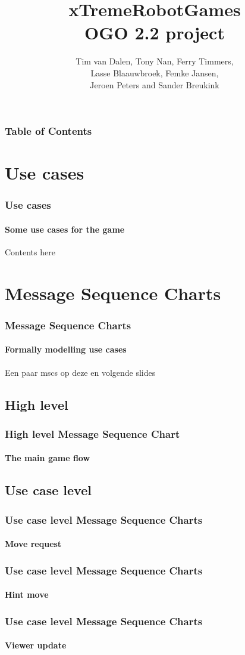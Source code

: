 \documentclass{beamer}
\title{xTremeRobotGames\\\small OGO 2.2 project}
\author{Tim van Dalen, Tony Nan, Ferry Timmers,\\ 
                Lasse Blaauwbroek, Femke Jansen,\\
                Jeroen Peters and Sander Breukink\\}
\institute[TU/e]{}
\begin{document}
	\frame{\titlepage}
	
	\begin{frame}
	    \frametitle{Table of Contents}
    		\tableofcontents
  	\end{frame}

	\section{Use cases}
	\begin{frame}
		\frametitle{Use cases}
		\framesubtitle{Some use cases for the game}
		Contents here
	\end{frame}

	\section{Message Sequence Charts}
	\begin{frame}
		\frametitle{Message Sequence Charts}
		\framesubtitle{Formally modelling use cases}
		Een paar mscs op deze en volgende slides
	\end{frame}
	
	\subsection{High level}
	\begin{frame}
		\frametitle{High level Message Sequence Chart}
		\framesubtitle{The main game flow}
		
	\end{frame}
	\subsection{Use case level}

	\begin{frame}
		\frametitle{Use case level Message Sequence Charts}
		\framesubtitle{Move request}
		\scalebox{0.9}{
			
		}
		
	\end{frame}
	\begin{frame}
		\frametitle{Use case level Message Sequence Charts}
		\framesubtitle{Hint move}
		\scalebox{0.8}{
			
		}
		
	\end{frame}
	\begin{frame}
		\frametitle{Use case level Message Sequence Charts}
		\framesubtitle{Viewer update}
		\scalebox{0.8}{
			
		}
		
	\end{frame}
\end{document}
